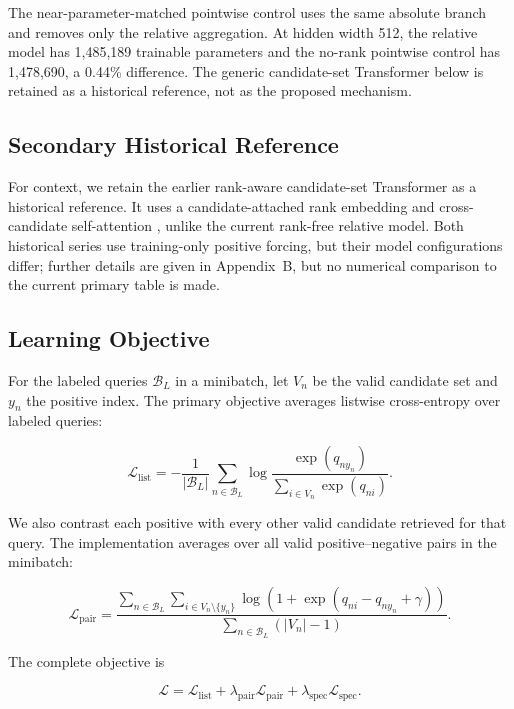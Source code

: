\documentclass[runningheads]{llncs}
\begin{document}
The near-parameter-matched pointwise control uses the same absolute branch and
removes only the relative aggregation. At hidden width 512, the relative model
has 1,485,189 trainable parameters and the no-rank pointwise control has
1,478,690, a 0.44\% difference. The generic candidate-set Transformer below
is retained as a historical reference, not as the proposed mechanism.

\subsection{Secondary Historical Reference}

For context, we retain the earlier rank-aware candidate-set Transformer as a
historical reference. It uses a candidate-attached rank embedding and cross-
candidate self-attention \cite{vaswani2017attention}, unlike the current rank-free relative model.
Both historical series use training-only positive forcing, but their model
configurations differ; further details are given in
Appendix~B, but no numerical comparison to the current primary table is made.

\subsection{Learning Objective}

For the labeled queries $\mathcal{B}_{L}$ in a minibatch, let $V_n$ be the valid
candidate set and $y_n$ the positive index. The primary objective averages
listwise cross-entropy over labeled queries:

\begin{equation}
  \mathcal{L}_{\mathrm{list}}
  =-\frac{1}{|\mathcal{B}_{L}|}
  \sum_{n\in\mathcal{B}_{L}}
  \log\frac{\exp(q_{ny_n})}{\sum_{i\in V_n}\exp(q_{ni})}.
\end{equation}

We also contrast each positive with every other valid candidate retrieved for
that query. The implementation averages over all valid positive--negative pairs
in the minibatch:

\begin{equation}
  \mathcal{L}_{\mathrm{pair}}
  =\frac{
  \sum_{n\in\mathcal{B}_{L}}\sum_{i\in V_n\setminus\{y_n\}}
  \log\!\left(1+\exp(q_{ni}-q_{ny_n}+\gamma)\right)}
  {\sum_{n\in\mathcal{B}_{L}}\left(|V_n|-1\right)}.
\end{equation}

The complete objective is

\begin{equation}
  \mathcal{L}
  =\mathcal{L}_{\mathrm{list}}
  +\lambda_{\mathrm{pair}}\mathcal{L}_{\mathrm{pair}}
  +\lambda_{\mathrm{spec}}\mathcal{L}_{\mathrm{spec}}.
\end{equation}
\end{document}
